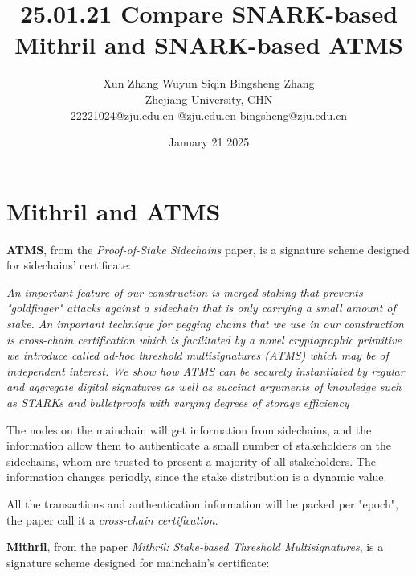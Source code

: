 \documentclass{article}
\title{25.01.21 Compare SNARK-based Mithril and SNARK-based ATMS}
\author{Xun Zhang \quad \quad Wuyun Siqin \quad \quad Bingsheng Zhang \\ 
Zhejiang University, CHN \\
22221024@zju.edu.cn \quad 3210101763@zju.edu.cn \quad bingsheng@zju.edu.cn}
\date{January 21 2025}
\begin{document}
\maketitle

\section{Mithril and ATMS}

\textbf{ATMS},
from the \textit{Proof-of-Stake Sidechains} paper, is a signature scheme designed for sidechains' certificate:

\vspace{0.3cm}

\textit{An important feature of our construction is merged-staking
that prevents "goldfinger" attacks against a sidechain that is only carrying a small amount of stake. An important technique for pegging chains that we use in our construction is cross-chain certification which is facilitated by a novel cryptographic primitive we introduce called ad-hoc threshold multisignatures (ATMS) which may be of independent interest. We show how ATMS can be securely instantiated by regular and aggregate digital signatures as well as succinct arguments of knowledge such as STARKs and bulletproofs with varying degrees of storage efficiency}

\vspace{0.3cm}

The nodes on the mainchain will get information from sidechains, and the information allow them to authenticate a small number of stakeholders on the sidechains, whom are trusted to present a majority of all stakeholders. The information changes periodly, since the stake distribution is a dynamic value.


All the transactions and authentication information will be packed per "epoch", the paper call it a \textit{cross-chain certification}.


\vspace{0.3cm}


\textbf{Mithril}, from the paper \textit{Mithril: Stake-based Threshold Multisignatures}, is a signature scheme designed for mainchain's certificate:

\vspace{0.3cm}
\end{document}
